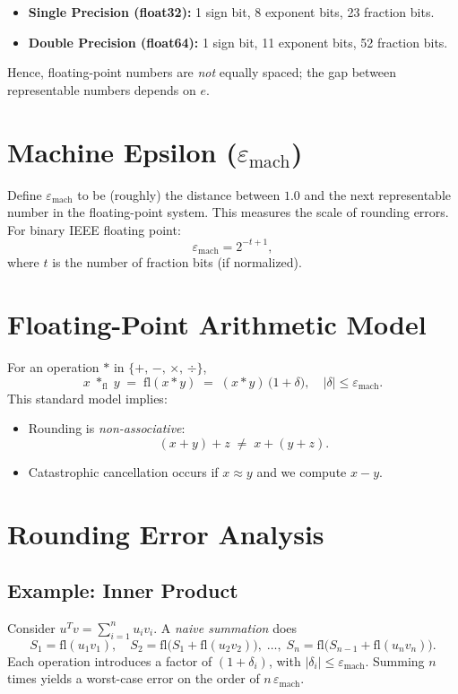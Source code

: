 \begin{itemize}
    \item \textbf{Single Precision (float32):} 1 sign bit, 8 exponent bits, 23 fraction bits.
    \item \textbf{Double Precision (float64):} 1 sign bit, 11 exponent bits, 52 fraction bits.
\end{itemize}

\noindent
Hence, floating-point numbers are \emph{not} equally spaced; the gap between representable numbers depends on $e$.

\section*{Machine Epsilon \texorpdfstring{($\varepsilon_{\mathrm{mach}}$)}{}}

Define $\varepsilon_{\mathrm{mach}}$ to be (roughly) the distance between $1.0$ and the next representable number in the floating-point system. This measures the scale of rounding errors. For binary IEEE floating point:
\[
\varepsilon_{\mathrm{mach}} = 2^{-t+1},
\]
where $t$ is the number of fraction bits (if normalized).

\section*{Floating-Point Arithmetic Model}

For an operation $*$ in $\{+,\,-,\,\times,\,\div\}$,
\[
x \;*_{\mathrm{fl}}\; y \;=\; \mathrm{fl}(x * y) \;=\; (x * y)\,\bigl(1 + \delta\bigr),
\quad
|\delta| \le \varepsilon_{\mathrm{mach}}.
\]
This standard model implies:
\begin{itemize}
    \item Rounding is \emph{non-associative}:
    \[
      (x + y) + z \;\neq\; x + (y + z).
    \]
    \item Catastrophic cancellation occurs if $x \approx y$ and we compute $x - y$.
\end{itemize}

\section*{Rounding Error Analysis}

\subsection*{Example: Inner Product}

Consider $u^T v = \sum_{i=1}^n u_i v_i$. A \emph{naive summation} does
\[
S_1 = \mathrm{fl}(u_1 v_1), \quad
S_2 = \mathrm{fl}\bigl(S_1 + \mathrm{fl}(u_2 v_2)\bigr), \;\dots,\;
S_n = \mathrm{fl}\bigl(S_{n-1} + \mathrm{fl}(u_n v_n)\bigr).
\]
Each operation introduces a factor of $(1 + \delta_i)$, with $|\delta_i| \le \varepsilon_{\mathrm{mach}}$. Summing $n$ times yields a worst-case error on the order of $n\,\varepsilon_{\mathrm{mach}}$.

